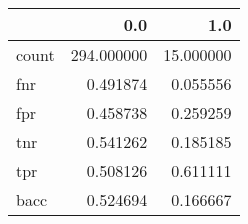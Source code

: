 \begin{tabular}{lrr}
\toprule
{} &         0.0 &        1.0 \\
\midrule
count &  294.000000 &  15.000000 \\
fnr   &    0.491874 &   0.055556 \\
fpr   &    0.458738 &   0.259259 \\
tnr   &    0.541262 &   0.185185 \\
tpr   &    0.508126 &   0.611111 \\
bacc  &    0.524694 &   0.166667 \\
\bottomrule
\end{tabular}
